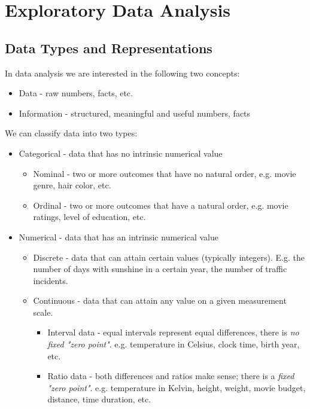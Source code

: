\chapter{Exploratory Data Analysis}

\section{Data Types and Representations}
\begin{definition}
    In data analysis we are interested in the following two concepts:
    \begin{itemize}
        \item Data - raw numbers, facts, etc.
        \item Information - structured, meaningful and useful numbers, facts
    \end{itemize}
\end{definition}

\begin{definition}
    We can classify data into two types:
    \begin{itemize}
        \item Categorical - data that has no intrinsic numerical value
            \begin{itemize}
                \item Nominal - two or more outcomes that have no natural order, e.g. movie genre, hair color, etc.
                \item Ordinal - two or more outcomes that have a natural order, e.g. movie ratings, level of education, etc.
            \end{itemize}

        \item Numerical - data that has an intrinsic numerical value
            \begin{itemize}
                \item Discrete - data that can attain certain values (typically integers). E.g. the number of days
                    with sunshine in a certain year, the number of traffic incidents.
                \item Continuous - data that can attain any value on a given measurement scale.
                    \begin{itemize}
                        \item Interval data - equal intervals represent equal differences, there is \emph{no fixed "zero point"}.
                            e.g. temperature in Celsius, clock time, birth year, etc.
                        \item Ratio data - both differences and ratios make sense; there is a \emph{fixed "zero point"}.
                            e.g. temperature in Kelvin, height, weight, movie budget, distance, time duration, etc.
                    \end{itemize}
            \end{itemize}
    \end{itemize}
\end{definition}

